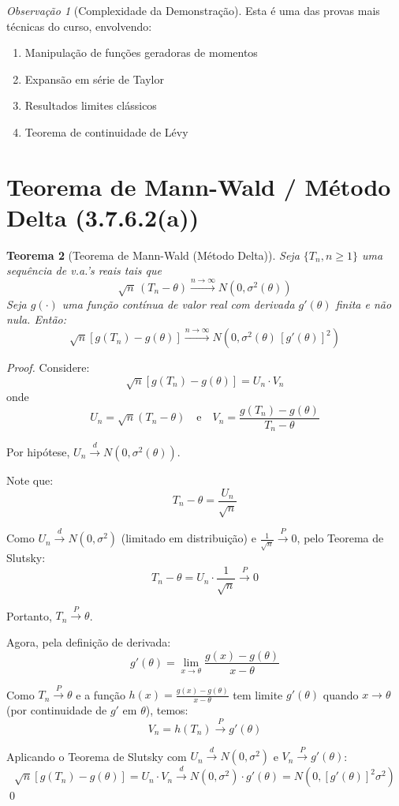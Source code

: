 \documentclass[12pt,a4paper]{article}
\theoremstyle{plain}
\newtheorem{teorema}{Teorema}[section]
\theoremstyle{definition}
\theoremstyle{remark}
\newtheorem{observacao}[teorema]{Observação}
\begin{document}
\begin{observacao}[Complexidade da Demonstração]
Esta é uma das provas mais técnicas do curso, envolvendo:
\begin{enumerate}
    \item Manipulação de funções geradoras de momentos
    \item Expansão em série de Taylor
    \item Resultados limites clássicos
    \item Teorema de continuidade de Lévy
\end{enumerate}
\end{observacao}

\section{Teorema de Mann-Wald / Método Delta (3.7.6.2(a))}

\begin{teorema}[Teorema de Mann-Wald (Método Delta)]
Seja $\{T_n, n \geq 1\}$ uma sequência de v.a.'s reais tais que
\[
\sqrt{n} \, (T_n - \theta) \xrightarrow{n \to \infty} N\left(0, \sigma^2(\theta)\right)
\]
Seja $g(\cdot)$ uma função contínua de valor real com derivada $g'(\theta)$ finita e não nula. Então:
\[
\sqrt{n} \left[ g(T_n) - g(\theta) \right] \xrightarrow{n \to \infty} N\left(0, \sigma^2(\theta) \, [g'(\theta)]^2 \right)
\]
\end{teorema}

\begin{proof}
Considere:
\[
\sqrt{n} \left[ g(T_n) - g(\theta) \right] = U_n \cdot V_n
\]
onde
\[
U_n = \sqrt{n} (T_n - \theta) \quad \text{e} \quad V_n = \frac{g(T_n) - g(\theta)}{T_n - \theta}
\]

Por hipótese, $U_n \xrightarrow{d} N(0, \sigma^2(\theta))$.

Note que:
\[
T_n - \theta = \frac{U_n}{\sqrt{n}}
\]

Como $U_n \xrightarrow{d} N(0, \sigma^2)$ (limitado em distribuição) e $\frac{1}{\sqrt{n}} \xrightarrow{P} 0$, pelo Teorema de Slutsky:
\[
T_n - \theta = U_n \cdot \frac{1}{\sqrt{n}} \xrightarrow{P} 0
\]

Portanto, $T_n \xrightarrow{P} \theta$.

Agora, pela definição de derivada:
\[
g'(\theta) = \lim_{x \to \theta} \frac{g(x) - g(\theta)}{x - \theta}
\]

Como $T_n \xrightarrow{P} \theta$ e a função $h(x) = \frac{g(x) - g(\theta)}{x - \theta}$ tem limite $g'(\theta)$ quando $x \to \theta$ (por continuidade de $g'$ em $\theta$), temos:
\[
V_n = h(T_n) \xrightarrow{P} g'(\theta)
\]

Aplicando o Teorema de Slutsky com $U_n \xrightarrow{d} N(0, \sigma^2)$ e $V_n \xrightarrow{P} g'(\theta)$:
\[
\sqrt{n} \left[ g(T_n) - g(\theta) \right] = U_n \cdot V_n \xrightarrow{d} N(0, \sigma^2) \cdot g'(\theta) = N\left(0, [g'(\theta)]^2 \sigma^2\right)
\]
\qed
\end{proof}
\end{document}
